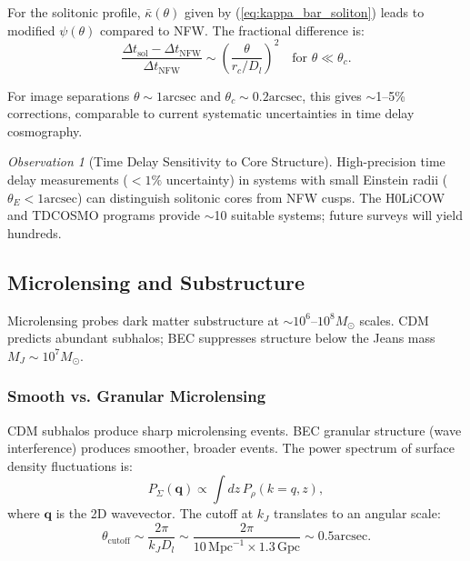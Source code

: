\documentclass[11pt,a4paper]{article}
\newcommand{\Msun}{\ensuremath{M_\odot}}
\newcommand{\Mpc}{\ensuremath{\mathrm{Mpc}}}
\newcommand{\Gpc}{\ensuremath{\mathrm{Gpc}}}
\newcommand{\arcsec}{\ensuremath{\text{arcsec}}}
\theoremstyle{definition}
\theoremstyle{remark}
\newtheorem{observation}{Observation}[section]
\begin{document}
For the solitonic profile, $\bar{\kappa}(\theta)$ given by (\ref{eq:kappa_bar_soliton}) leads to modified $\psi(\theta)$ compared to NFW. The fractional difference is:
\begin{equation}
\frac{\Delta t_{\mathrm{sol}} - \Delta t_{\mathrm{NFW}}}{\Delta t_{\mathrm{NFW}}} \sim \left(\frac{\theta}{r_c/D_l}\right)^2 \quad \text{for } \theta \ll \theta_c.
\end{equation}

For image separations $\theta \sim 1\arcsec$ and $\theta_c \sim 0.2\arcsec$, this gives $\sim$1--5\% corrections, comparable to current systematic uncertainties in time delay cosmography.

\begin{observation}[Time Delay Sensitivity to Core Structure]
High-precision time delay measurements ($<1\%$ uncertainty) in systems with small Einstein radii ($\theta_E < 1\arcsec$) can distinguish solitonic cores from NFW cusps. The H0LiCOW and TDCOSMO programs provide $\sim$10 suitable systems; future surveys will yield hundreds.
\end{observation}

\subsection{Microlensing and Substructure}
\label{sec:microlensing_obs}

Microlensing probes dark matter substructure at $\sim 10^6$--$10^8 \Msun$ scales. CDM predicts abundant subhalos; BEC suppresses structure below the Jeans mass $M_J \sim 10^7 \Msun$.

\subsubsection{Smooth vs. Granular Microlensing}

CDM subhalos produce sharp microlensing events. BEC granular structure (wave interference) produces smoother, broader events. The power spectrum of surface density fluctuations is:
\begin{equation}
P_{\Sigma}(\mathbf{q}) \propto \int dz \, P_\rho(k = q, z),
\end{equation}
where $\mathbf{q}$ is the 2D wavevector. The cutoff at $k_J$ translates to an angular scale:
\begin{equation}
\theta_{\mathrm{cutoff}} \sim \frac{2\pi}{k_J D_l} \sim \frac{2\pi}{10 \, \Mpc^{-1} \times 1.3 \, \Gpc} \sim 0.5\arcsec.
\end{equation}
\end{document}
